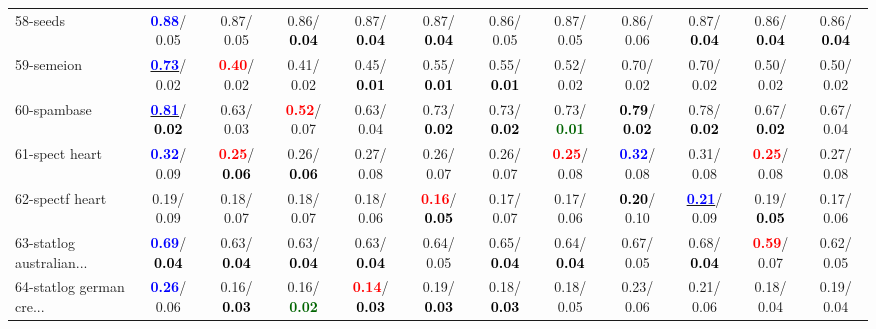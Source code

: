 \begin{table}[h]
\begin{center}
{\begin{tabular}{lc|c|c|c|c|c|c|c|c|c|c}
58-seeds & \textcolor{blue}{\textbf{  0.88}}/  0.05 &   0.87/  0.05 &   0.86/\textcolor{black}{\textbf{  0.04}} &   0.87/\textcolor{black}{\textbf{  0.04}} &   0.87/\textcolor{black}{\textbf{  0.04}} &   0.86/  0.05 &   0.87/  0.05 &   0.86/  0.06 &   0.87/\textcolor{black}{\textbf{  0.04}} &   0.86/\textcolor{black}{\textbf{  0.04}} &   0.86/\textcolor{black}{\textbf{  0.04}} \\
59-semeion & \underline{\textcolor{blue}{\textbf{  0.73}}}/  0.02 & \textcolor{red}{\textbf{  0.40}}/  0.02 &   0.41/  0.02 &   0.45/\textcolor{black}{\textbf{  0.01}} &   0.55/\textcolor{black}{\textbf{  0.01}} &   0.55/\textcolor{black}{\textbf{  0.01}} &   0.52/  0.02 &   0.70/  0.02 &   0.70/  0.02 &   0.50/  0.02 &   0.50/  0.02 \\
60-spambase & \underline{\textcolor{blue}{\textbf{  0.81}}}/\textcolor{black}{\textbf{  0.02}} &   0.63/  0.03 & \textcolor{red}{\textbf{  0.52}}/  0.07 &   0.63/  0.04 &   0.73/\textcolor{black}{\textbf{  0.02}} &   0.73/\textcolor{black}{\textbf{  0.02}} &   0.73/\textcolor{darkgreen}{\textbf{  0.01}} & \textcolor{black}{\textbf{  0.79}}/\textcolor{black}{\textbf{  0.02}} &   0.78/\textcolor{black}{\textbf{  0.02}} &   0.67/\textcolor{black}{\textbf{  0.02}} &   0.67/  0.04 \\ \hline
61-spect heart & \textcolor{blue}{\textbf{  0.32}}/  0.09 & \textcolor{red}{\textbf{  0.25}}/\textcolor{black}{\textbf{  0.06}} &   0.26/\textcolor{black}{\textbf{  0.06}} &   0.27/  0.08 &   0.26/  0.07 &   0.26/  0.07 & \textcolor{red}{\textbf{  0.25}}/  0.08 & \textcolor{blue}{\textbf{  0.32}}/  0.08 &   0.31/  0.08 & \textcolor{red}{\textbf{  0.25}}/  0.08 &   0.27/  0.08 \\
62-spectf heart &   0.19/  0.09 &   0.18/  0.07 &   0.18/  0.07 &   0.18/  0.06 & \textcolor{red}{\textbf{  0.16}}/\textcolor{black}{\textbf{  0.05}} &   0.17/  0.07 &   0.17/  0.06 & \textcolor{black}{\textbf{  0.20}}/  0.10 & \underline{\textcolor{blue}{\textbf{  0.21}}}/  0.09 &   0.19/\textcolor{black}{\textbf{  0.05}} &   0.17/  0.06 \\
63-statlog australian... & \textcolor{blue}{\textbf{  0.69}}/\textcolor{black}{\textbf{  0.04}} &   0.63/\textcolor{black}{\textbf{  0.04}} &   0.63/\textcolor{black}{\textbf{  0.04}} &   0.63/\textcolor{black}{\textbf{  0.04}} &   0.64/  0.05 &   0.65/\textcolor{black}{\textbf{  0.04}} &   0.64/\textcolor{black}{\textbf{  0.04}} &   0.67/  0.05 &   0.68/\textcolor{black}{\textbf{  0.04}} & \textcolor{red}{\textbf{  0.59}}/  0.07 &   0.62/  0.05 \\
64-statlog german cre... & \textcolor{blue}{\textbf{  0.26}}/  0.06 &   0.16/\textcolor{black}{\textbf{  0.03}} &   0.16/\textcolor{darkgreen}{\textbf{  0.02}} & \textcolor{red}{\textbf{  0.14}}/\textcolor{black}{\textbf{  0.03}} &   0.19/\textcolor{black}{\textbf{  0.03}} &   0.18/\textcolor{black}{\textbf{  0.03}} &   0.18/  0.05 &   0.23/  0.06 &   0.21/  0.06 &   0.18/  0.04 &   0.19/  0.04 \\\end{tabular}
}\label{strats1bRFw}
\end{center}
\end{table}
